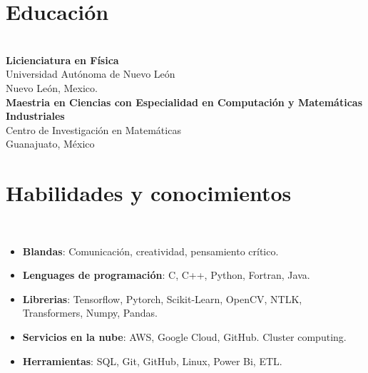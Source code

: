 \documentclass[a3paper]{adcv_color}
\newcommand{\proyect}[2]{
\textbf{#2}\\
{\color{linktext}	\textbf {#1}}
\vspace{-1cm}\\
}
\begin{document}
\begin{minipage}{0.38\linewidth}
	\section{Educación}\\

	\textbf{Licienciatura en Física} \\
	Universidad Autónoma de Nuevo León\\
	Nuevo León, Mexico.\\

	\textbf{Maestria en Ciencias con Especialidad en Computación y Matemáticas Industriales}\\
	Centro de Investigación en Matemáticas\\
	Guanajuato, México
\end{minipage}
\begin{minipage}{0.62\linewidth}
	\section{Habilidades y conocimientos}\\
	\begin{itemize}
		\setlength\itemsep{0em}
		\item \textbf{Blandas}:
		      Comunicación, creatividad, pensamiento crítico.
		\item \textbf{Lenguages de programación}:
		      C, C++, Python, Fortran, Java.
		\item \textbf{Librerias}:
		      Tensorflow, Pytorch, Scikit-Learn, OpenCV, NTLK, Transformers, Numpy, Pandas.
		\item \textbf{Servicios en la nube}:
		      AWS, Google Cloud, GitHub. Cluster computing.
		\item \textbf{Herramientas}:
		      SQL, Git, GitHub, Linux, Power Bi, ETL.
	\end{itemize}
\end{minipage}



\end{document}
